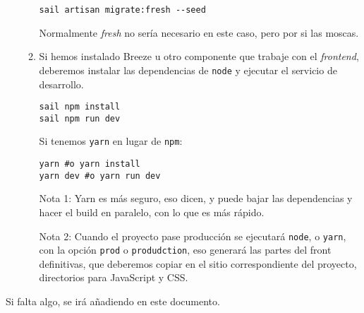 \documentclass[11pt]{article}
\begin{document}
\begin{enumerate}
\begin{enumerate}
\begin{verbatim}
sail artisan migrate:fresh --seed
\end{verbatim}
Normalmente \emph{fresh} no sería necesario en este caso, pero por
si las moscas.
\item Si hemos instalado Breeze u otro componente que trabaje con
el \emph{frontend}, deberemos instalar las dependencias de \texttt{node}
y ejecutar el servicio de desarrollo.
\begin{verbatim}
sail npm install
sail npm run dev
\end{verbatim}
Si tenemos \texttt{yarn} en lugar de \texttt{npm}:
\begin{verbatim}
yarn #o yarn install
yarn dev #o yarn run dev
\end{verbatim}
Nota 1:
Yarn es más seguro, eso dicen, y puede bajar las dependencias
y hacer el build en paralelo, con lo que es más rápido.

Nota 2:
Cuando el proyecto pase producción se ejecutará \texttt{node}, o \texttt{yarn},
con la opción \texttt{prod} o \texttt{produdction}, eso generará las partes
del front definitivas, que deberemos copiar en el sitio
correspondiente del proyecto, directorios para JavaScript y CSS.
\end{enumerate}
\end{enumerate}

Si falta algo, se irá añadiendo en este documento.
\end{document}
